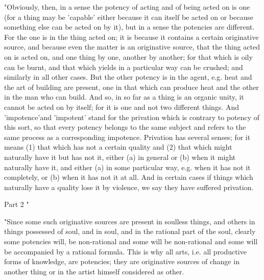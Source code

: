 "Obviously, then, in a sense the potency of acting and of being acted
on is one (for a thing may be 'capable' either because it can itself
be acted on or because something else can be acted on by it), but
in a sense the potencies are different. For the one is in the thing
acted on; it is because it contains a certain originative source,
and because even the matter is an originative source, that the thing
acted on is acted on, and one thing by one, another by another; for
that which is oily can be burnt, and that which yields in a particular
way can be crushed; and similarly in all other cases. But the other
potency is in the agent, e.g. heat and the art of building are present,
one in that which can produce heat and the other in the man who can
build. And so, in so far as a thing is an organic unity, it cannot
be acted on by itself; for it is one and not two different things.
And 'impotence'and 'impotent' stand for the privation which is contrary
to potency of this sort, so that every potency belongs to the same
subject and refers to the same process as a corresponding impotence.
Privation has several senses; for it means (1) that which has not
a certain quality and (2) that which might naturally have it but has
not it, either (a) in general or (b) when it might naturally have
it, and either (a) in some particular way, e.g. when it has not it
completely, or (b) when it has not it at all. And in certain cases
if things which naturally have a quality lose it by violence, we say
they have suffered privation. 

Part 2 "

"Since some such originative sources are present in soulless things,
and others in things possessed of soul, and in soul, and in the rational
part of the soul, clearly some potencies will, be non-rational and
some will be non-rational and some will be accompanied by a rational
formula. This is why all arts, i.e. all productive forms of knowledge,
are potencies; they are originative sources of change in another thing
or in the artist himself considered as other. 

